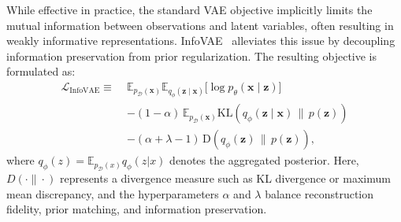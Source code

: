 While effective in practice, the standard VAE objective implicitly limits the mutual information between observations and latent variables,
often resulting in weakly informative representations.
InfoVAE~\cite{zhao2017infovae} alleviates this issue by decoupling information preservation from prior regularization.
The resulting objective is formulated as: 
\begin{equation}
\begin{aligned}
\mathcal{L}_{\text{InfoVAE}} \equiv\;&
\mathbb{E}_{p_{\mathcal{D}}(\mathbf{x})}
\mathbb{E}_{q_\phi(\mathbf{z} \mid \mathbf{x})}
\big[ \log p_\theta(\mathbf{x} \mid \mathbf{z}) \big] \\
&- (1 - \alpha)\,
\mathbb{E}_{p_{\mathcal{D}}(\mathbf{x})}
\mathrm{KL}\!\left(q_\phi(\mathbf{z} \mid \mathbf{x}) \,\|\, p(\mathbf{z})\right) \\
&- (\alpha + \lambda - 1)\,
\mathrm{D}\!\left(q_\phi(\mathbf{z}) \,\|\, p(\mathbf{z})\right),
\end{aligned}
\label{Eq:infovae}
\end{equation}
where $q_\phi(z) = \mathbb{E}_{p_{\mathcal{D}}(x)} q_\phi(z | x)$ denotes the aggregated posterior.
Here, $D(\cdot\|\cdot)$ represents a divergence measure such as KL divergence or maximum mean discrepancy, and the hyperparameters $\alpha$ and $\lambda$ balance reconstruction fidelity, prior matching, and information preservation.

